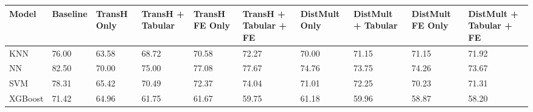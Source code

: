 \begin{tabular}{llllllllll}
\toprule
Model & Baseline & TransH Only & TransH + Tabular & TransH FE Only & TransH + Tabular + FE & DistMult Only & DistMult + Tabular & DistMult FE Only & DistMult + Tabular + FE \\
\midrule
KNN & 76.00 & 63.58 & 68.72 & 70.58 & 72.27 & 70.00 & 71.15 & 71.15 & 71.92 \\
NN & 82.50 & 70.00 & 75.00 & 77.08 & 77.67 & 74.76 & 73.75 & 74.26 & 73.67 \\
SVM & 78.31 & 65.42 & 70.49 & 72.37 & 74.04 & 71.01 & 72.25 & 70.23 & 71.31 \\
XGBoost & 71.42 & 64.96 & 61.75 & 61.67 & 59.75 & 61.18 & 59.96 & 58.87 & 58.20 \\
\bottomrule
\end{tabular}
